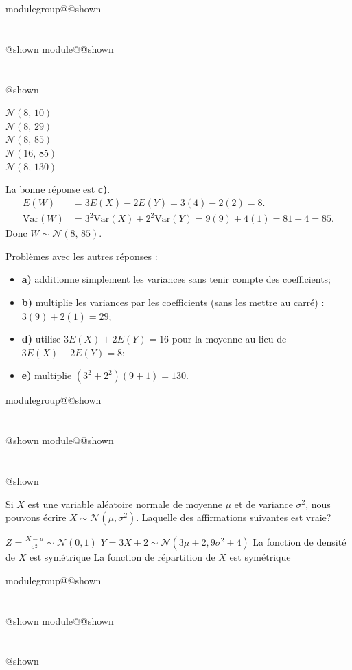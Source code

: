 \documentclass{Evaluation}
\makeatletter
\newcommand{\currentmodulekey}{}
\newcommand{\currentmoduletitle}{}
\newcommand{\currentgroupkey}{}
\newcommand{\currentgrouptitle}{}
\newcommand{\showmoduleifneeded}{%
  \ifx\currentgroupkey\empty\else
    \expandafter\ifx\csname modulegroup@\currentgroupkey @shown\endcsname\relax
      \section*{\currentgrouptitle}%
      \expandafter\gdef\csname modulegroup@\currentgroupkey @shown\endcsname{1}%
    \fi
  \fi
  \expandafter\ifx\csname module@\currentmodulekey @shown\endcsname\relax
    \section*{\currentmoduletitle}%
    \expandafter\gdef\csname module@\currentmodulekey @shown\endcsname{1}%
  \fi
}
\newenvironment{A22}{\showmoduleifneeded}{}
\newenvironment{H26r}{\showmoduleifneeded}{}
\makeatother
\begin{document}
\begin{questions}
\begin{H26r}
\begin{checkboxes}
\choice $\mathcal{N}(8,\,10)$\\[4pt]
\choice $\mathcal{N}(8,\,29)$\\[4pt]
\correctchoice $\mathcal{N}(8,\,85)$\\[4pt]
\choice $\mathcal{N}(16,\,85)$\\[4pt]
\choice $\mathcal{N}(8,\,130)$
\end{checkboxes}

\begin{solution}
La bonne réponse est \textbf{c)}.
\begin{align*}
E(W)&=3E(X)-2E(Y)=3(4)-2(2)=8.\\
\mathrm{Var}(W)&=3^2\mathrm{Var}(X)+2^2\mathrm{Var}(Y)=9(9)+4(1)=81+4=85.
\end{align*}
Donc $W\sim\mathcal{N}(8,\,85)$.

Problèmes avec les autres réponses :
\begin{itemize}
\item \textbf{a)} additionne simplement les variances sans tenir compte des coefficients;
\item \textbf{b)} multiplie les variances par les coefficients (sans les mettre au carré) : $3(9)+2(1)=29$;
\item \textbf{d)} utilise $3E(X)+2E(Y)=16$ pour la moyenne au lieu de $3E(X)-2E(Y)=8$;
\item \textbf{e)} multiplie $(3^2+2^2)(9+1)=130$.
\end{itemize}
\end{solution}
\end{H26r}

\begin{A22}
\question {} %
Si $X$ est une variable aléatoire normale de moyenne $\mu$ et de variance $\sigma^2$, nous pouvons écrire $X\sim\mathcal{N}(\mu, \sigma^2)$. Laquelle des affirmations suivantes est vraie? 

\begin{checkboxes}
\choice $\displaystyle Z=\frac{X-\mu}{\sigma^2}\sim \mathcal{N}(0, 1)$
\choice $\displaystyle Y=3X+2 \sim \mathcal{N}(3\mu+2, 9\sigma^2 + 4)$
\CorrectChoice La fonction de densité de $X$ est symétrique
\choice La fonction de répartition de $X$ est symétrique
\end{checkboxes}
\end{A22}

\begin{A22}
\question {} %


\end{A22}
\end{questions}
\end{document}
